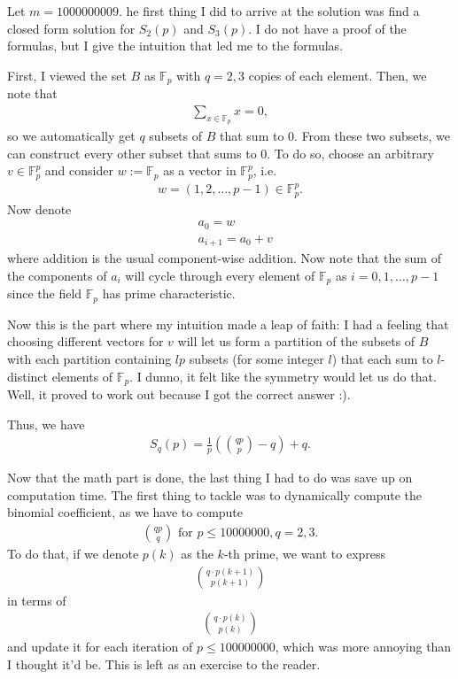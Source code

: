 \documentclass[12pt]{article}
\begin{document}
 
\noindent
Let $m = 1000000009$. he first thing I did to arrive at the solution was find a closed form solution for $S_2(p)$ and $S_3(p)$. I do not have a proof of the formulas, but I give the intuition that led me to the formulas.

First, I viewed the set $B$ as $\mathbb{F}_p$ with $q = 2, 3$ copies of each element. Then, we note that
\begin{align*}
    \sum_{x \in \mathbb{F}_p} x = 0,
\end{align*}
so we automatically get $q$ subsets of $B$ that sum to 0. From these two subsets, we can construct every other subset that sums to 0. To do so, choose an arbitrary $v \in \mathbb{F}_p^p$ and consider $w := \mathbb{F}_p$ as a vector in $\mathbb{F}_p^p$, i.e.
\begin{align*}
    w = (1, 2, \dots, p-1) \in \mathbb{F}_p^p.
\end{align*}
Now denote
\begin{align*}
    &a_0 = w\\
    &a_{i+1} = a_0 + v
\end{align*}
where addition is the usual component-wise addition. Now note that the sum of the components of $a_i$ will cycle through every element of $\mathbb{F}_p$ as $i = 0, 1, \dots, p - 1$ since the field $\mathbb{F}_p$ has prime characteristic. 

Now this is the part where my intuition made a leap of faith: I had a feeling that choosing different vectors for $v$ will let us form a partition of the subsets of $B$ with each partition containing $lp$ subsets (for some integer $l$) that each sum to $l$-distinct elements of $\mathbb{F}_p$. I dunno, it felt like the symmetry would let us do that. Well, it proved to work out because I got the correct answer :).

Thus, we have
\begin{align*}
    S_q(p) = \frac{1}{p} \left(\binom{qp}{p} - q\right) + q.
\end{align*}

Now that the math part is done, the last thing I had to do was save up on computation time. The first thing to tackle was to dynamically compute the binomial coefficient, as we have to compute 
\begin{align*}
    \binom{qp}{q} \text{ for } p \leq 10000000, q = 2, 3.
\end{align*}
To do that, if we denote $p(k)$ as the $k$-th prime, we want to express
\begin{align*}
    \binom{q\cdot p(k+1)}{p(k+1)}
\end{align*}
in terms of
\begin{align*}
    \binom{q\cdot p(k)}{p(k)}
\end{align*}
and update it for each iteration of $p \leq 100000000$, which was more annoying than I thought it'd be. This is left as an exercise to the reader.
\end{document}
